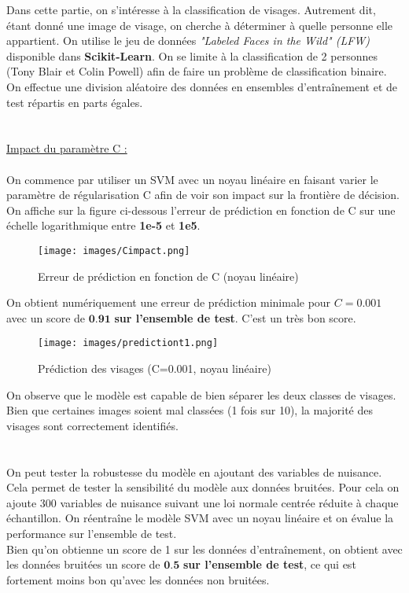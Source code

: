 \documentclass[a4paper, 12pt]{article}
\begin{document}
Dans cette partie, on s'intéresse à la classification de visages. Autrement dit, étant donné une image de visage, on cherche à déterminer à quelle personne elle appartient.
On utilise le jeu de données \textit{"Labeled Faces in the Wild" (LFW)} disponible dans \textbf{Scikit-Learn}. On se limite à la classification de 2 personnes (Tony Blair et Colin Powell) afin de faire un problème de classification binaire.
On effectue une division aléatoire des données en ensembles d'entraînement et de test répartis en parts égales.
\\
\\
\\
\underline{Impact du paramètre C :}
\\
\\
On commence par utiliser un SVM avec un noyau linéaire en faisant varier le paramètre de régularisation C afin de voir son impact sur la frontière de décision.
\\
On affiche sur la figure ci-dessous l'erreur de prédiction en fonction de C sur une échelle logarithmique entre \textbf{1e-5} et \textbf{1e5}.

\begin{figure}[h]
    \centering
    \texttt{[image: images/Cimpact.png]}
    \caption{Erreur de prédiction en fonction de C (noyau linéaire)}
    \label{fig:faceC}
\end{figure}

On obtient numériquement une erreur de prédiction minimale pour $C=0.001$ avec un score de $\textbf{0.91}$ \textbf{sur l'ensemble de test}. C'est un très bon score.

\begin{figure}[h!]
    \centering
    \texttt{[image: images/predictiont1.png]}
    \caption{Prédiction des visages (C=0.001, noyau linéaire)}
    \label{fig:faceC2}
\end{figure}
\newpage
On observe que le modèle est capable de bien séparer les deux classes de visages. Bien que certaines images soient mal classées (1 fois sur 10), la majorité des visages sont correctement identifiés.
\\
\\
\\
On peut tester la robustesse du modèle en ajoutant des variables de nuisance. Cela permet de tester la sensibilité du modèle aux données bruitées.
Pour cela on ajoute 300 variables de nuisance suivant une loi normale centrée réduite à chaque échantillon. On réentraîne le modèle SVM avec un noyau linéaire et on évalue la performance sur l'ensemble de test.
\\
Bien qu'on obtienne un score de 1 sur les données d'entraînement, on obtient avec les données bruitées un score de $\textbf{0.5}$ \textbf{sur l'ensemble de test}, ce qui est fortement moins bon qu'avec les données non bruitées.
\\
\end{document}

